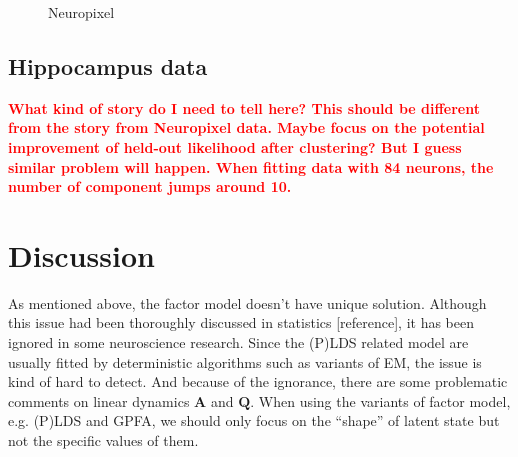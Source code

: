 \documentclass{article}
\begin{document}
\begin{figure}[h!]
		\caption{Neuropixel}
	\end{figure}
	
	\subsection{Hippocampus data}
	
	\textcolor{red}{\textbf{What kind of story do I need to tell here? This should be different from the story from Neuropixel data. Maybe focus on the potential improvement of held-out likelihood after clustering? But I guess similar problem will happen. When fitting data with 84 neurons, the number of component jumps around 10.}}
	
	\section{Discussion}
	
	As mentioned above, the factor model doesn’t have unique solution. Although this issue had been thoroughly discussed in statistics [reference], it has been ignored in some neuroscience research. Since the (P)LDS related model are usually fitted by deterministic algorithms such as variants of EM, the issue is kind of hard to detect. And because of the ignorance, there are some problematic comments on linear dynamics $\bm{A}$ and $\bm{Q}$. When using the variants of factor model, e.g. (P)LDS and GPFA, we should only focus on the “shape” of latent state but not the specific values of them.
	
\end{document}
